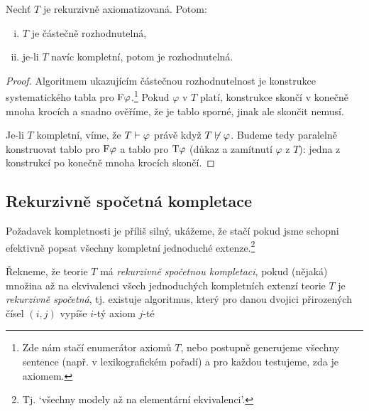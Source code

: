 \begin{proposition}
    Nechť $T$ je rekurzivně axiomatizovaná. Potom:
    \begin{enumerate}[(i)]
        \item $T$ je částečně rozhodnutelná,
        \item je-li $T$ navíc kompletní, potom je rozhodnutelná.
    \end{enumerate}
\end{proposition}
\begin{proof}
Algoritmem ukazujícím částečnou rozhodnutelnost je konstrukce systematického tabla pro $\mathrm{F}\varphi$.\footnote{Zde nám stačí enumerátor axiomů $T$, nebo postupně generujeme všechny sentence (např. v lexikografickém pořadí) a pro každou testujeme, zda je axiomem.} Pokud $\varphi$ v $T$ platí, konstrukce skončí v konečně mnoha krocích a snadno ověříme, že je tablo sporné, jinak ale skončit nemusí.

Je-li $T$ kompletní, víme, že $T\vdash\varphi$ právě když $T\not\vdash\varphi$. Budeme tedy paralelně konstruovat tablo pro $\mathrm{F}\varphi$ a tablo pro $\mathrm{T}\varphi$ (důkaz a zamítnutí $\varphi$ z $T$): jedna z konstrukcí po konečně mnoha krocích skončí.
\end{proof}


\subsection{Rekurzivně spočetná kompletace}

Požadavek kompletnosti je příliš silný, ukážeme, že stačí pokud jsme schopni efektivně popsat všechny kompletní jednoduché extenze.\footnote{Tj. `všechny modely až na elementární ekvivalenci'.}

\begin{definition}
Řekneme, že teorie $T$ má \emph{rekurzivně spočetnou kompletaci}, pokud (nějaká) množina až na ekvivalenci všech jednoduchých kompletních extenzí teorie $T$ je \emph{rekurzivně spočetná}, tj. existuje algoritmus, který pro danou dvojici přirozených čísel $(i,j)$ vypíše $i$-tý axiom $j$-té 
\end{definition}

\todo

